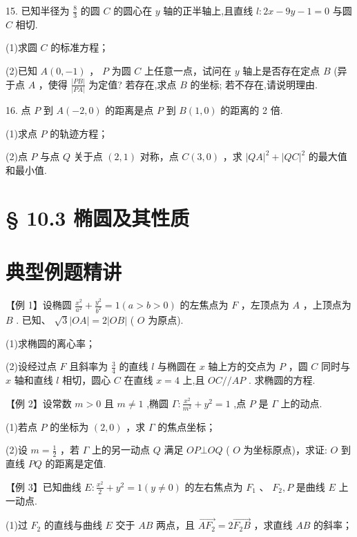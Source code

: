 15. 已知半径为 $\frac{8}{3}$ 的圆 $C$ 的圆心在 $y$ 轴的正半轴上,且直线 $l : {2x} - {9y} - 1 = 0$ 与圆 $C$ 相切.

(1)求圆 $C$ 的标准方程；

(2)已知 $A\left( {0, - 1}\right)$ ， $P$ 为圆 $C$ 上任意一点，试问在 $y$ 轴上是否存在定点 $B$ (异于点 $A$ ，使得 $\frac{\left| PB\right| }{\left| PA\right| }$ 为定值? 若存在,求点 $B$ 的坐标; 若不存在,请说明理由.

16. 点 $P$ 到 $A\left( {-2,0}\right)$ 的距离是点 $P$ 到 $B\left( {1,0}\right)$ 的距离的 2 倍.

(1)求点 $P$ 的轨迹方程；

(2)点 $P$ 与点 $Q$ 关于点 $\left( {2,1}\right)$ 对称，点 $C\left( {3,0}\right)$ ，求 ${\left| QA\right| }^{2} + {\left| QC\right| }^{2}$ 的最大值和最小值.

\section*{§ 10.3 椭圆及其性质}

\section*{典型例题精讲}

【例 1】设椭圆 $\frac{{x}^{2}}{{a}^{2}} + \frac{{y}^{2}}{{b}^{2}} = 1\left( {a > b > 0}\right)$ 的左焦点为 $F$ ，左顶点为 $A$ ，上顶点为 $B$ . 已知、 $\sqrt{3}\left| {OA}\right|  = 2\left| {OB}\right|$ ( $O$ 为原点).

(1)求椭圆的离心率；

(2)设经过点 $F$ 且斜率为 $\frac{3}{4}$ 的直线 $l$ 与椭圆在 $x$ 轴上方的交点为 $P$ ，圆 $C$ 同时与 $x$ 轴和直线 $l$ 相切，圆心 $C$ 在直线 $x = 4$ 上,且 ${OC}//{AP}$ . 求椭圆的方程.

【例 2】设常数 $m > 0$ 且 $m \neq  1$ ,椭圆 $\Gamma  : \frac{{x}^{2}}{{m}^{2}} + {y}^{2} = 1$ ,点 $P$ 是 $\Gamma$ 上的动点.

(1)若点 $P$ 的坐标为 $\left( {2,0}\right)$ ，求 $\Gamma$ 的焦点坐标；

(2)设 $m = \frac{1}{2}$ ，若 $\Gamma$ 上的另一动点 $Q$ 满足 ${OP} \bot  {OQ}$ ( $O$ 为坐标原点)，求证: $O$ 到直线 ${PQ}$ 的距离是定值.

【例 3】已知曲线 $E : \frac{{x}^{2}}{2} + {y}^{2} = 1\left( {y \neq  0}\right)$ 的左右焦点为 ${F}_{1}\text{ 、 }{F}_{2},P$ 是曲线 $E$ 上一动点.

(1)过 ${F}_{2}$ 的直线与曲线 $E$ 交于 ${AB}$ 两点，且 $\overrightarrow{A{F}_{2}} = 2\overrightarrow{{F}_{2}B}$ ，求直线 ${AB}$ 的斜率；

